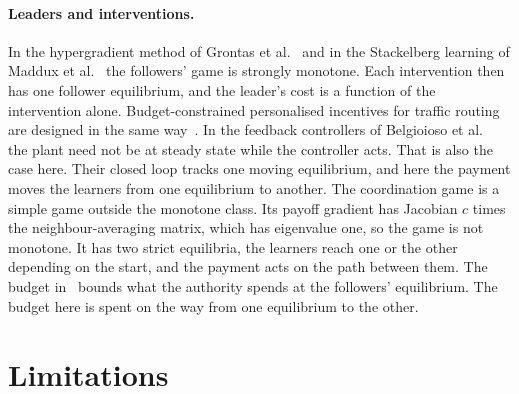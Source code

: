 \documentclass[11pt,a4paper]{article}
\theoremstyle{definition}
\theoremstyle{plain}
\begin{document}
\paragraph{Leaders and interventions.}
In the hypergradient method of Grontas et al.~\cite{grontas2024} and in the Stackelberg learning of Maddux et al.~\cite{maddux2025} the followers' game is strongly monotone. Each intervention then has one follower equilibrium, and the leader's cost is a function of the intervention alone. Budget-constrained personalised incentives for traffic routing are designed in the same way~\cite{grontas2023}. In the feedback controllers of Belgioioso et al.~\cite{belgioioso2024} the plant need not be at steady state while the controller acts. That is also the case here. Their closed loop tracks one moving equilibrium, and here the payment moves the learners from one equilibrium to another. The coordination game is a simple game outside the monotone class. Its payoff gradient has Jacobian $c$ times the neighbour-averaging matrix, which has eigenvalue one, so the game is not monotone. It has two strict equilibria, the learners reach one or the other depending on the start, and the payment acts on the path between them. The budget in~\cite{grontas2023} bounds what the authority spends at the followers' equilibrium. The budget here is spent on the way from one equilibrium to the other.

\section{Limitations}\label{sec:limits}
\end{document}
